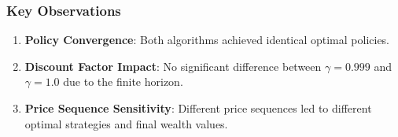 \documentclass[10pt,a4paper]{article}
\begin{document}
\subsubsection{Key Observations}

\begin{enumerate}
    \item \textbf{Policy Convergence}: Both algorithms achieved identical optimal policies.
    
    \item \textbf{Discount Factor Impact}: No significant difference between $\gamma = 0.999$ and $\gamma = 1.0$ due to the finite horizon.
    
    \item \textbf{Price Sequence Sensitivity}: Different price sequences led to different optimal strategies and final wealth values.
\end{enumerate}
\end{document}
